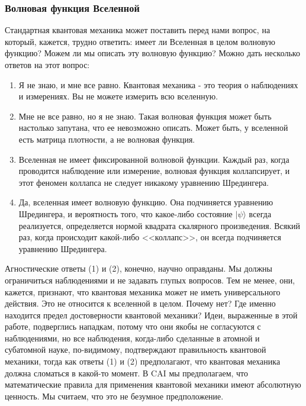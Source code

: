 \documentclass[main.tex]{subfiles}
\begin{document}
\subsubsection{Волновая функция Вселенной}\label{ch5.3.1}

Стандартная квантовая механика может поставить перед нами вопрос, на который, кажется, трудно ответить: имеет ли Вселенная в целом волновую функцию? Можем ли мы описать эту волновую функцию? Можно дать несколько ответов на этот вопрос:

\begin{enumerate}
\item Я не знаю, и мне все равно. Квантовая механика - это теория о наблюдениях и измерениях. Вы не можете измерить всю вселенную.
\item Мне не все равно, но я не знаю. Такая волновая функция может быть настолько запутана, что ее невозможно описать. Может быть, у вселенной есть матрица плотности, а не волновая функция.
\item Вселенная не имеет фиксированной волновой функции. Каждый раз, когда проводится наблюдение или измерение, волновая функция коллапсирует, и этот феномен коллапса не следует никакому уравнению Шредингера.
\item Да, вселенная имеет волновую функцию. Она подчиняется уравнению Шредингера, и вероятность того, что какое-либо состояние $|\psi\rangle$ всегда реализуется, определяется нормой квадрата скалярного произведения. Всякий раз, когда происходит какой-либо  <<коллапс>>, он всегда подчиняется уравнению Шредингера.
\end{enumerate}
              
Агностические ответы (1) и (2), конечно, научно оправданы. Мы должны ограничиться наблюдениями и не задавать глупых вопросов. Тем не менее, они, кажется, признают, что квантовая механика может не иметь универсального действия. Это не относится к вселенной в целом. Почему нет? Где именно находится предел достоверности квантовой механики? Идеи, выраженные в этой работе, подверглись нападкам, потому что они якобы не согласуются с наблюдениями, но все наблюдения, когда-либо сделанные в атомной и субатомной науке, по-видимому, подтверждают правильность квантовой механики, тогда как ответы (1) и (2) предполагают, что квантовая механика должна сломаться в какой-то момент. В CAI мы предполагаем, что математические правила для применения квантовой механики имеют абсолютную ценность. Мы считаем, что это не безумное предположение.
\end{document}
